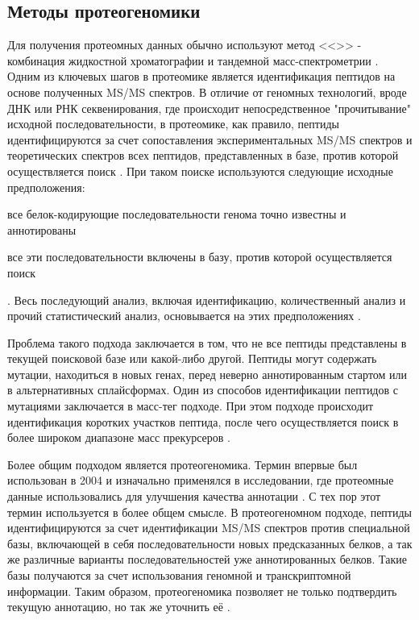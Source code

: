\subsection{Методы протеогеномики}
Для получения протеомных данных обычно используют метод <<>> - комбинация жидкостной хроматографии и тандемной масс-спектрометрии \cite{bantscheff2012quantitative}. Одним из ключевых шагов в протеомике является идентификация пептидов на основе полученных MS/MS спектров. В отличие от геномных технологий, вроде ДНК или РНК секвенирования, где происходит непосредственное "прочитывание" исходной последовательности, в протеомике, как правило, пептиды идентифицируются за счет сопоставления экспериментальных MS/MS спектров и теоретических спектров всех пептидов, представленных в базе, против которой осуществляется поиск \cite{nesvizhskii2010survey}.
При таком поиске используются следующие исходные предположения: 
\begin{inparaenum}
    \item все белок-кодирующие последовательности генома точно известны и аннотированы
    \item все эти последовательности включены в базу, против которой осуществляется поиск
\end{inparaenum}.
Весь последующий анализ, включая идентификацию, количественный анализ и прочий статистический анализ, основывается на этих предположениях \cite{nesvizhskii2005interpretation}.

Проблема такого подхода заключается в том, что не все пептиды представлены в текущей поисковой базе или какой-либо другой. Пептиды могут содержать мутации, находиться в новых генах, перед неверно аннотированным стартом или в альтернативных сплайсформах. 
Один из способов идентификации пептидов с мутациями заключается в масс-тег подходе. При этом подходе происходит идентификация коротких участков пептида, после чего осуществляется поиск в более широком диапазоне масс прекурсеров \cite{dasari2010tagrecon}. 

Более общим подходом является протеогеномика. Термин впервые был использован в 2004 и изначально применялся в исследовании, где протеомные данные использовались для улучшения качества аннотации \cite{jaffe2004proteogenomic}. С тех пор этот термин используется в более общем смысле. В протеогеномном подходе, пептиды идентифицируются за счет идентификации MS/MS спектров против специальной базы, включающей в себя последовательности новых предсказанных белков, а так же различные варианты последовательностей уже аннотированных белков. Такие базы получаются за счет использования геномной и транскриптомной информации. Таким образом, протеогеномика позволяет не только подтвердить текущую аннотацию, но так же уточнить её \cite{nesvizhskii2014proteogenomics}. 

